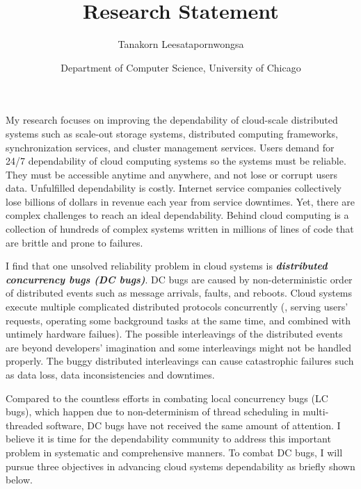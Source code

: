 \documentclass[11pt]{article}
\begin{document}
\title{Research Statement}
\author{Tanakorn Leesatapornwongsa}
\date{\vspace{-1ex} \small{Department of Computer Science, University of
Chicago}}

\maketitle

My research focuses on improving the dependability of cloud-scale distributed
systems such as scale-out storage systems, distributed computing frameworks,
synchronization services, and cluster management services. Users demand for
24/7 dependability of cloud computing systems so the systems must be reliable.
They must be accessible anytime and anywhere, and not lose or corrupt users
data. Unfulfilled dependability is costly. Internet service companies
collectively lose billions of dollars in revenue each year from service
downtimes. Yet, there are complex challenges to reach an ideal dependability.
Behind cloud computing is a collection of hundreds of complex systems written in
millions of lines of code that are brittle and prone to failures.

I find that one unsolved reliability problem in cloud systems is
\textbf{\textit{distributed concurrency bugs (DC bugs)}}. DC bugs are caused by
non-deterministic order of distributed events such as message arrivals, faults,
and reboots. Cloud systems execute multiple complicated distributed protocols
concurrently (\eg, serving users' requests, operating some background tasks at
the same time, and combined with untimely hardware failues). The possible
interleavings of the distributed events are beyond developers' imagination and
some interleavings might not be handled properly. The buggy
distributed interleavings can cause catastrophic failures such as data loss,
data inconsistencies and downtimes. 

Compared to the countless efforts in combating local concurrency bugs (LC bugs),
which happen due to non-determinism of thread scheduling in multi-threaded
software, DC bugs have not received the same amount of attention. I believe it
is time for the dependability community to address this important problem in
systematic and comprehensive manners. To combat DC bugs, I will pursue three
objectives in advancing cloud systems dependability as briefly shown below.
\end{document}
